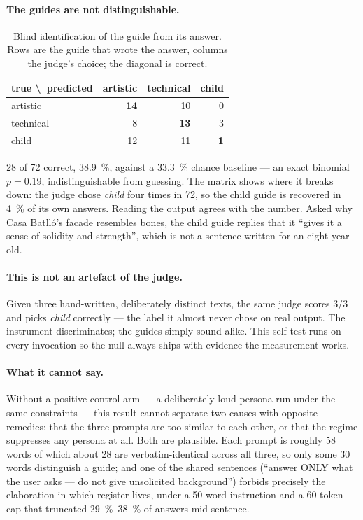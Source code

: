 \documentclass[11pt,a4paper]{article}
\begin{document}
\paragraph{The guides are not distinguishable.}

\begin{table}[h]
\centering
\caption{Blind identification of the guide from its answer. Rows are the guide
that wrote the answer, columns the judge's choice; the diagonal is correct.}
\begin{tabular}{lrrr}
\toprule
\textbf{true \textbackslash\ predicted} & \textbf{artistic} & \textbf{technical} & \textbf{child} \\
\midrule
artistic  & \textbf{14} & 10 & 0 \\
technical & 8  & \textbf{13} & 3 \\
child     & 12 & 11 & \textbf{1} \\
\bottomrule
\end{tabular}
\end{table}

28 of 72 correct, \SI{38.9}{\percent}, against a \SI{33.3}{\percent} chance
baseline --- an exact binomial $p = 0.19$, indistinguishable from guessing. The
matrix shows where it breaks down: the judge chose \emph{child} four times in 72,
so the child guide is recovered in \SI{4}{\percent} of its own answers. Reading
the output agrees with the number. Asked why Casa Batll\'o's facade resembles
bones, the child guide replies that it ``gives it a sense of solidity and
strength'', which is not a sentence written for an eight-year-old.

\paragraph{This is not an artefact of the judge.} Given three hand-written,
deliberately distinct texts, the same judge scores 3/3 and picks \emph{child}
correctly --- the label it almost never chose on real output. The instrument
discriminates; the guides simply sound alike. This self-test runs on every
invocation so the null always ships with evidence the measurement works.

\paragraph{What it cannot say.} Without a positive control arm --- a deliberately
loud persona run under the same constraints --- this result cannot separate two
causes with opposite remedies: that the three prompts are too similar to each
other, or that the regime suppresses any persona at all. Both are plausible. Each
prompt is roughly 58 words of which about 28 are verbatim-identical across all
three, so only some 30 words distinguish a guide; and one of the shared sentences
(``answer ONLY what the user asks --- do not give unsolicited background'')
forbids precisely the elaboration in which register lives, under a 50-word
instruction and a 60-token cap that truncated \SIrange{29}{38}{\percent} of
answers mid-sentence.
\end{document}
